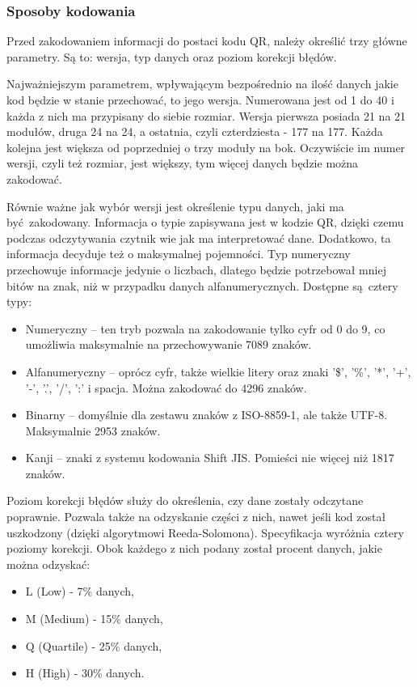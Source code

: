 \subsubsection*{Sposoby kodowania}
Przed zakodowaniem informacji do postaci kodu QR, należy określić trzy główne parametry. Są to: wersja, typ danych oraz poziom korekcji błędów.

Najważniejszym parametrem, wpływającym bezpośrednio na ilość danych jakie kod będzie w stanie przechować, to jego wersja. Numerowana jest od 1 do 40 i każda z nich ma przypisany do siebie rozmiar. Wersja pierwsza posiada 21 na 21 modułów, druga 24 na 24, a ostatnia, czyli czterdziesta - 177 na 177. Każda kolejna jest większa od poprzedniej o trzy moduły na bok. Oczywiście im numer wersji, czyli też rozmiar, jest większy, tym więcej danych będzie można zakodować. 

Równie ważne jak wybór wersji jest określenie typu danych, jaki ma być zakodowany. Informacja o typie zapisywana jest w kodzie QR, dzięki czemu podczas odczytywania czytnik wie jak ma interpretować dane. Dodatkowo, ta informacja decyduje też o maksymalnej pojemności. Typ numeryczny przechowuje informacje jedynie o liczbach, dlatego będzie potrzebował mniej bitów na znak, niż w przypadku danych alfanumerycznych. Dostępne są cztery typy:

\begin{itemize}
	\item Numeryczny -- ten tryb pozwala na zakodowanie tylko cyfr od 0 do 9, co umożliwia maksymalnie na przechowywanie 7089 znaków.
	\item Alfanumeryczny -- oprócz cyfr, także wielkie litery oraz znaki '\$', '\%', '*', '+', '-', '.', '/', ':' i spacja. Można zakodować do 4296 znaków. 
	\item Binarny -- domyślnie dla zestawu znaków z ISO-8859-1, ale także UTF-8. Maksymalnie 2953 znaków.
	\item Kanji -- znaki z systemu kodowania Shift JIS. Pomieści nie więcej niż 1817 znaków.
\end{itemize}

Poziom korekcji błędów służy do określenia, czy dane zostały odczytane poprawnie. Pozwala także na odzyskanie części z nich, nawet jeśli kod został uszkodzony (dzięki algorytmowi Reeda-Solomona). Specyfikacja wyróżnia cztery poziomy korekcji. Obok każdego z nich podany został procent danych, jakie można odzyskać:

\begin{itemize}
	\item L (Low) - 7\% danych,
	\item M (Medium) - 15\% danych,
	\item Q (Quartile) - 25\% danych,
	\item H (High) - 30\% danych.
\end{itemize}

